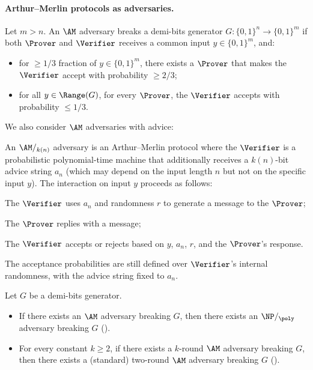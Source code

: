 \paragraph{Arthur--Merlin protocols as adversaries.}

\begin{definition}
    Let $m > n$. An $\AM$ adversary breaks a demi-bits generator $G:\{0, 1\}^n \to \{0, 1\}^m$ if both $\Prover$ and $\Verifier$ receives a common input $y\in\{0, 1\}^m$, and:
    \begin{itemize}
        \item for $\ge 1/3$ fraction of $y\in \{0, 1\}^m$, there exists a $\Prover$ that makes the $\Verifier$ accept with probability $\ge 2/3$;
        \item for all $y\in \Range(G)$, for every $\Prover$, the $\Verifier$ accepts with probability $\le 1/3$.
    \end{itemize}
\end{definition}

We also consider $\AM$ adversaries with advice:

\begin{definition}[$\AM/_{k(n)}$ adversaries]
    An $\AM/_{k(n)}$ adversary is an Arthur--Merlin protocol where the $\Verifier$ is a probabilistic polynomial-time machine that additionally receives a $k(n)$-bit advice string $a_n$ (which may depend on the input length $n$ but not on the specific input $y$). The interaction on input $y$ proceeds as follows:
    \begin{compactenum}
        \item The $\Verifier$ uses $a_n$ and randomness $r$ to generate a message to the $\Prover$;
        \item The $\Prover$ replies with a message;
        \item The $\Verifier$ accepts or rejects based on $y$, $a_n$, $r$, and the $\Prover$'s response.
    \end{compactenum}
    The acceptance probabilities are still defined over $\Verifier$'s internal randomness, with the advice string fixed to $a_n$.
\end{definition}


\begin{proposition}
    Let $G$ be a demi-bits generator.
    \begin{itemize}
        \item If there exists an $\AM$ adversary breaking $G$, then there exists an $\NP/_{\poly}$ adversary breaking $G$ \textnormal{(\cite{Adleman78})}.
        \item For every constant $k\ge 2$, if there exists a $k$-round $\AM$ adversary breaking $G$, then there exists a (standard) two-round $\AM$ adversary breaking $G$ \textnormal{(\cite{Babai85})}.
    \end{itemize}
\end{proposition}


